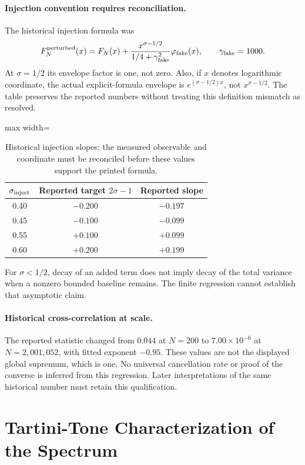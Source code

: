 \documentclass[11pt,a4paper]{article}
\theoremstyle{plain}
\theoremstyle{definition}
\theoremstyle{remark}
\begin{document}
\paragraph{Injection convention requires reconciliation.}
The historical injection formula was
\[
 F_N^{\rm perturbed}(x)=F_N(x)+
 \frac{x^{\sigma-1/2}}{1/4+\gamma_{\rm fake}^2}\varphi_{\rm fake}(x),
 \qquad \gamma_{\rm fake}=1000.
\]
At $\sigma=1/2$ its envelope factor is one, not zero. Also, if $x$ denotes
logarithmic coordinate, the actual explicit-formula envelope is
$e^{(\sigma-1/2)x}$, not $x^{\sigma-1/2}$. The table preserves the reported
numbers without treating this definition mismatch as resolved.
\begin{table}[h]
\centering
\begin{adjustbox}{max width=\linewidth}\begin{tabular}{ccc}
\toprule
$\sigma_{\rm inject}$ & Reported target $2\sigma-1$ & Reported slope \\
\midrule
0.40 & $-0.200$ & $-0.197$ \\
0.45 & $-0.100$ & $-0.099$ \\
0.55 & $+0.100$ & $+0.099$ \\
0.60 & $+0.200$ & $+0.199$ \\
\bottomrule
\end{tabular}\end{adjustbox}
\caption{Historical injection slopes; the measured observable and coordinate
must be reconciled before these values support the printed formula.}
\label{tab:injection-scaling}
\end{table}
For $\sigma<1/2$, decay of an added term does not imply decay of the total
variance when a nonzero bounded baseline remains. The finite regression
cannot establish that asymptotic claim.

\paragraph{Historical cross-correlation at scale.}
The reported statistic changed from $0.044$ at $N=200$ to
$7.00\times10^{-6}$ at $N=2{,}001{,}052$, with fitted exponent
$-0.95$. These values are not the displayed global supremum, which is
one. No universal cancellation rate or proof of the converse is inferred
from this regression. Later interpretations of the same historical number
must retain this qualification.

\section{Tartini-Tone Characterization of the Spectrum}
\label{sec:tartini}
\end{document}
